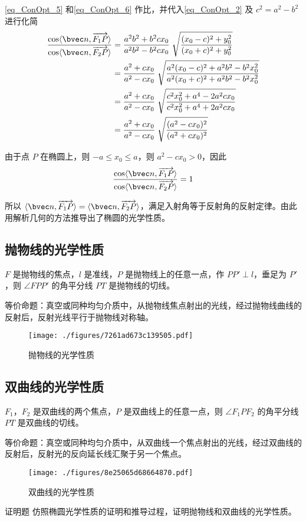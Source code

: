 \autoref{eq_ConOpt_5} 和\autoref{eq_ConOpt_6} 作比，并代入\autoref{eq_ConOpt_2} 及 $c^2=a^2-b^2$ 进行化简
\begin{equation}
\begin{aligned}
\frac{\cos\langle\bvec n,\overrightarrow{F_1P}\rangle}{\cos\langle\bvec n,\overrightarrow{F_2P}\rangle} &=\frac{a^2 b^2+b^2cx_0}{a^2 b^2-b^2cx_0}\; \sqrt{\frac{(x_0-c)^2+y_0^2}{(x_0+c)^2+y_0^2}} \\
&=\frac{a^2+cx_0}{a^2-cx_0}\; \sqrt{\frac{a^2(x_0-c)^2 +a^2 b^2-b^2 x_0^2}{a^2(x_0+c)^2 +a^2 b^2-b^2 x_0^2}} \\
&=\frac{a^2+cx_0}{a^2-cx_0}\; \sqrt{\frac{c^2 x_0^2 + a^4 - 2a^2 c x_0}{c^2 x_0^2 + a^4 + 2a^2 c x_0}} \\
&=\frac{a^2+cx_0}{a^2-cx_0}\; \sqrt{\frac{(a^2-cx_0)^2}{(a^2+cx_0)^2}}
\end{aligned}
\end{equation}

由于点 $P$ 在椭圆上，则 $-a\leqslant x_0 \leqslant a$，则 $a^2-cx_0 >0$，因此
\begin{equation}
\frac{\cos\langle\bvec n,\overrightarrow{F_1P}\rangle}{\cos\langle\bvec n,\overrightarrow{F_2P}\rangle}=1
\end{equation}

所以 $\langle \bvec n,\overrightarrow{F_1P}\rangle=\langle \bvec n,\overrightarrow{F_2P} \rangle$，满足入射角等于反射角的反射定律。由此用解析几何的方法推导出了椭圆的光学性质。


\subsection{抛物线的光学性质}
$F$ 是抛物线的焦点，$l$ 是准线，$P$ 是抛物线上的任意一点，作 $PP' \perp l$，垂足为 $P'$，则 $\angle FPP' $ 的角平分线 $ PT $ 是抛物线的切线。

等价命题：真空或同种均匀介质中，从抛物线焦点射出的光线，经过抛物线曲线的反射后，反射光线平行于抛物线对称轴。
\begin{figure}[ht]
\centering
\texttt{[image: ./figures/7261ad673c139505.pdf]}
\caption{抛物线的光学性质} \label{fig_ConOpt_4}
\end{figure}

\subsection{双曲线的光学性质}
$F_1$，$F_2$ 是双曲线的两个焦点，$P$ 是双曲线上的任意一点，则 $\angle F_1PF_2 $ 的角平分线 $ PT $ 是双曲线的切线。

等价命题：真空或同种均匀介质中，从双曲线一个焦点射出的光线，经过双曲线的反射后，反射光的反向延长线汇聚于另一个焦点。
\begin{figure}[ht]
\centering
\texttt{[image: ./figures/8e25065d68664870.pdf]}
\caption{双曲线的光学性质} \label{fig_ConOpt_5}
\end{figure}

\begin{exercise}{证明题}\label{exe_ConOpt_1}
仿照椭圆光学性质的证明和推导过程，证明抛物线和双曲线的光学性质。
\end{exercise}
